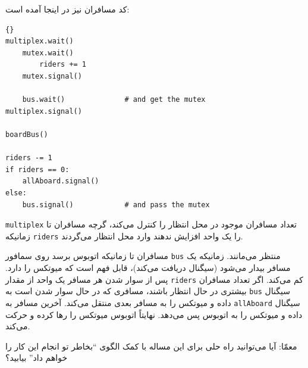 \documentclass{book}
\newcommand{\clearemptydoublepage}{\newpage\cleardoublepage}
\begin{document}
    کد مسافران نیز در اینجا آمده است:

\begin{latin}
\begin{lstlisting}[title=\rl{راه حل مساله اتوبوس (مسافران)}]{}
multiplex.wait()
    mutex.wait()
        riders += 1
    mutex.signal()

    bus.wait()              # and get the mutex
multiplex.signal()

boardBus()

riders -= 1
if riders == 0:
    allAboard.signal() 
else:
    bus.signal()            # and pass the mutex
\end{lstlisting}
\end{latin}

    {\tt multiplex}
    تعداد مسافران موجود در محل انتظار را کنترل می‌کند، گرچه مسافران تا زمانیکه {\tt riders} را یک واحد افزایش ندهند وارد محل انتظار می‌گردند. 
    

    مسافران تا زمانیکه اتوبوس برسد روی سمافور  {\tt bus} منتظر می‌‌مانند. زمانیکه یک مسافر بیدار می‌شود (سیگنال دریافت می‌کند)، قابل فهم است که 
    میوتکس را دارد. پس از سوار شدن هر مسافر یک واحد از مقدار  {\tt riders} کم می‌کند. اگر تعداد مسافران بیشتری در حال انتظار باشند، 
    مسافری که در حال سوار شدن است به  {\tt bus} سیگنال داده و میوتکس را به مسافر بعدی منتقل می‌کند. 
    آخرین مسافر به {\tt allAboard} سیگنال داده و میوتکس را به اتوبوس پس می‌دهد. 
    نهایتاً اتوبوس میوتکس را رها کرده و حرکت می‌کند. 

    معمّا: آیا می‌توانید راه حلی برای این مساله با کمک الگوی ``بخاطر تو انجام این کار را خواهم داد'' بیابید؟


\clearemptydoublepage
\end{document}
